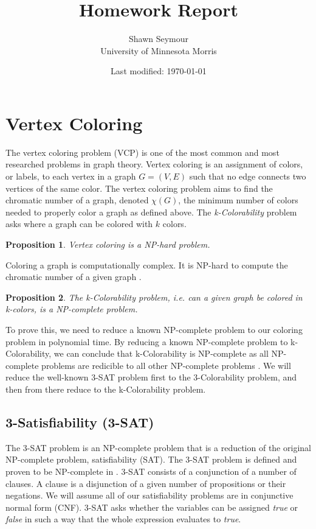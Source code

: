 \documentclass{article}
\title{Homework Report}
\date{Last modified: \today}
\author{Shawn Seymour\\ University of Minnesota Morris}
\newtheorem{prop}{Proposition}
\theoremstyle{definition}
\begin{document}
\maketitle

\section*{Vertex Coloring}
The vertex coloring problem (VCP) is one of the most common and most researched problems in graph theory. Vertex coloring is an assignment of colors, or labels, to each vertex in a graph \(G = (V, E)\) such that no edge connects two vertices of the same color. The vertex coloring problem aims to find the chromatic number of a graph, denoted \(\chi(G)\), the minimum number of colors needed to properly color a graph as defined above. The \emph{k-Colorability} problem asks where a graph can be colored with \(k\) colors.

\begin{prop}
Vertex coloring is a NP-hard problem.
\end{prop}

Coloring a graph is computationally complex. It is NP-hard to compute the chromatic number of a given graph \cite{garey}. 

\begin{prop}
The k-Colorability problem, i.e. can a given graph be colored in k-colors, is a NP-complete problem.
\end{prop}

To prove this, we need to reduce a known NP-complete problem to our coloring problem in polynomial time. By reducing a known NP-complete problem to k-Colorability, we can conclude that k-Colorability is NP-complete as all NP-complete problems are redicible to all other NP-complete problems \cite{gareynp}. We will reduce the well-known 3-SAT problem first to the 3-Colorability problem, and then from there reduce to the k-Colorability problem.

\subsection*{3-Satisfiability (3-SAT)}
The 3-SAT problem is an NP-complete problem that is a reduction of the original NP-complete problem, satisfiability (SAT). The 3-SAT problem is defined and proven to be NP-complete in \cite{gareynp}. 3-SAT consists of a conjunction of a number of clauses. A clause is a disjunction of a given number of propositions or their negations. We will assume all of our satisfiability problems are in conjunctive normal form (CNF). 3-SAT asks whether the variables can be assigned \emph{true} or \emph{false} in such a way that the whole expression evaluates to \emph{true}.
\end{document}
